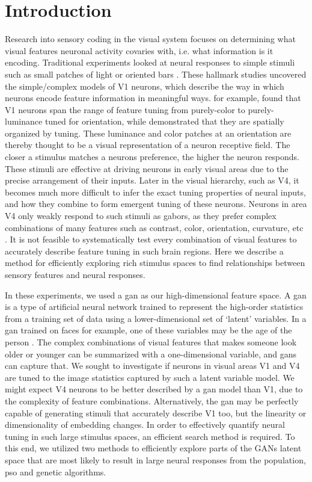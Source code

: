 \section{Introduction}
Research into sensory coding in the visual system focuses on determining what visual features neuronal activity covaries with, i.e. what information is it encoding. Traditional experiments looked at neural responses to simple stimuli such as small patches of light or oriented bars \parencite{Hubel1959}. These hallmark studies uncovered the simple/complex models of V1 neurons, which describe the way in which neurons encode feature information in meaningful ways. \cite{Johnson2008} for example, found that V1 neurons span the range of feature tuning from purely-color to purely-luminance tuned for orientation, while \cite{Garg2019} demonstrated that they are spatially organized by tuning. These luminance and color patches at an orientation are thereby thought to be a visual representation of a neuron receptive field. The closer a stimulus matches a neurons preference, the higher the neuron responds. These stimuli are effective at driving neurons in early visual areas due to the precise arrangement of their inputs. Later in the visual hierarchy, such as V4, it becomes much more difficult to infer the exact tuning properties of neural inputs, and how they combine to form emergent tuning of these neurons. Neurons in area V4 only weakly respond to such stimuli as gabors, as they prefer complex combinations of many features such as contrast, color, orientation, curvature, etc \parencite{Sani2013,Tanigawa2010, Nandy2016}. It is not feasible to systematically test every combination of visual features to accurately describe feature tuning in such brain regions. Here we describe a method for efficiently exploring rich stimulus spaces to find relationships between sensory features and neural responses.

In these experiments, we used a \gls{gan} as our high-dimensional feature space. A \gls{gan} is a type of artificial neural network trained to represent the high-order statistics from a training set of data using a lower-dimensional set of `latent’ variables. In a \gls{gan} trained on faces for example, one of these variables may be the age of the person \parencite{Karras2019}. The complex combinations of visual features that makes someone look older or younger can be summarized with a one-dimensional variable, and \glspl{gan} can capture that. We sought to investigate if neurons in visual areas V1 and V4 are tuned to the image statistics captured by such a latent variable model. We might expect V4 neurons to be better described by a \gls{gan} model than V1, due to the complexity of feature combinations. Alternatively, the \gls{gan} may be perfectly capable of generating stimuli that accurately describe V1 too, but the linearity or dimensionality of embedding changes. In order to effectively quantify neural tuning in such large stimulus spaces, an efficient search method is required. To this end, we utilized two methods to efficiently explore parts of the GANs latent space that are most likely to result in large neural responses from the population, \gls{pso} and genetic algorithms. 


